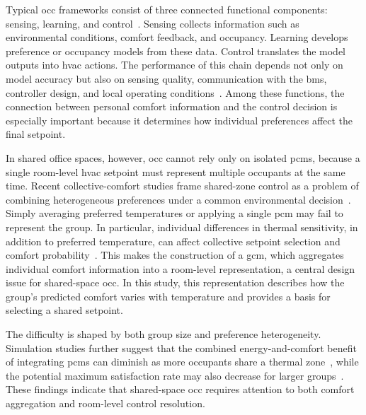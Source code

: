 Typical \ac{occ} frameworks consist of three connected functional components: sensing, learning, and control~\cite{soleimanijavid_challenges_2024}\cite{xie_review_2020}.
Sensing collects information such as environmental conditions, comfort feedback, and occupancy.
Learning develops preference or occupancy models from these data.
Control translates the model outputs into \ac{hvac} actions.
The performance of this chain depends not only on model accuracy but also on sensing quality, communication with the \ac{bms}, controller design, and local operating conditions~\cite{zhang_impact_2023}.
Among these functions, the connection between personal comfort information and the control decision is especially important because it determines how individual preferences affect the final setpoint.

In shared office spaces, however, \ac{occ} cannot rely only on isolated \acp{pcm}, because a single room-level \ac{hvac} setpoint must represent multiple occupants at the same time.
Recent collective-comfort studies frame shared-zone control as a problem of combining heterogeneous preferences under a common environmental decision~\cite{schumann_predicting_2010}\cite{topak_collective_2023}.
Simply averaging preferred temperatures or applying a single \ac{pcm} may fail to represent the group.
In particular, individual differences in thermal sensitivity, in addition to preferred temperature, can affect collective setpoint selection and comfort probability~\cite{jung_comparative_2019}.
This makes the construction of a \ac{gcm}, which aggregates individual comfort information into a room-level representation, a central design issue for shared-space \ac{occ}.
In this study, this representation describes how the group's predicted comfort varies with temperature and provides a basis for selecting a shared setpoint.

The difficulty is shaped by both group size and preference heterogeneity.
Simulation studies further suggest that the combined energy-and-comfort benefit of integrating \acp{pcm} can diminish as more occupants share a thermal zone~\cite{jung_energy_2020}\cite{jung_comparative_2019}, while the potential maximum satisfaction rate may also decrease for larger groups~\cite{wang_enhancing_2026}.
These findings indicate that shared-space \ac{occ} requires attention to both comfort aggregation and room-level control resolution.

